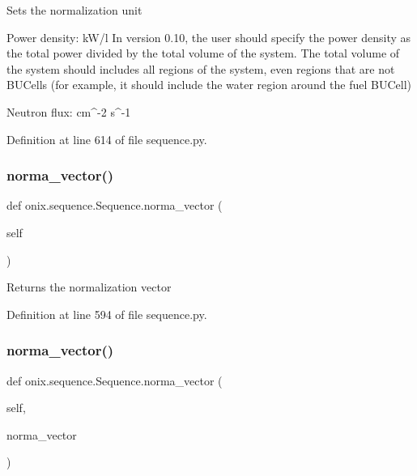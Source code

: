 \begin{DoxyVerb}Sets the normalization unit

Power density: kW/l
In version 0.10, the user should specify the power density as the total power
divided by the total volume of the system. The total volume of the system should includes
all regions of the system, even regions that are not BUCells (for example, it should include
the water region around the fuel BUCell)

Neutron flux: cm^-2 s^-1
\end{DoxyVerb}
 

Definition at line 614 of file sequence.\+py.

\mbox{\label{classonix_1_1sequence_1_1Sequence_a7c65d81c5dd1265034ba6c19c3aa6760}} 
\subsubsection{\texorpdfstring{norma\+\_\+vector()}{norma\_vector()}\hspace{0.1cm}{\footnotesize\ttfamily [1/2]}}
{\footnotesize\ttfamily def onix.\+sequence.\+Sequence.\+norma\+\_\+vector (\begin{DoxyParamCaption}\item[{}]{self }\end{DoxyParamCaption})}

\begin{DoxyVerb}Returns the normalization vector\end{DoxyVerb}
 

Definition at line 594 of file sequence.\+py.

\mbox{\label{classonix_1_1sequence_1_1Sequence_a19e647f8872e99c45940874da5d2ec58}} 
\subsubsection{\texorpdfstring{norma\+\_\+vector()}{norma\_vector()}\hspace{0.1cm}{\footnotesize\ttfamily [2/2]}}
{\footnotesize\ttfamily def onix.\+sequence.\+Sequence.\+norma\+\_\+vector (\begin{DoxyParamCaption}\item[{}]{self,  }\item[{}]{norma\+\_\+vector }\end{DoxyParamCaption})}

